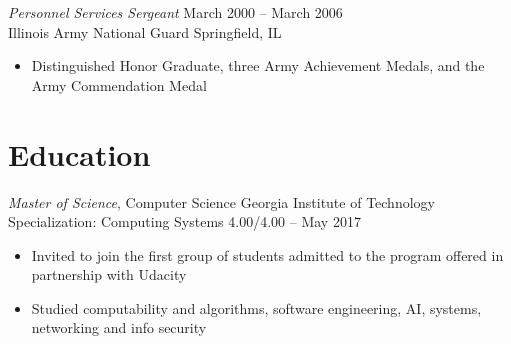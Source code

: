 \documentclass[margin,line]{resume}
\begin{document}
\begin{resume}


{\sl Personnel Services Sergeant}  \hfill   March 2000 -- March 2006\\
Illinois Army National Guard  \hfill   Springfield, IL
\begin{itemize} \itemsep -2pt %
\small\item Distinguished Honor Graduate, three Army Achievement Medals, and the Army Commendation Medal
\end{itemize}

\section{Education}
{\small
  {\sl Master of Science}, Computer Science \hfill
  Georgia Institute of Technology\\
  Specialization: Computing Systems \hfill
  4.00/4.00 -- May 2017
}
\begin{itemize} \itemsep -2pt %
\small\item Invited to join the first group of students admitted to the program offered in partnership with Udacity
\small\item Studied computability and algorithms, software engineering, AI, systems, networking and info security
\end{itemize}


\end{resume}
\end{document}
